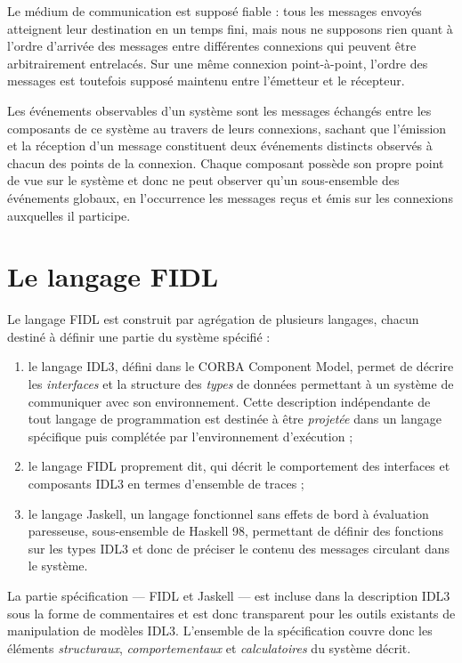 Le m\'edium de communication est suppos\'e fiable : tous les messages
envoy\'es atteignent leur destination en un temps fini, mais nous ne
supposons rien quant \`a l'ordre d'arriv\'ee des messages entre
diff\'erentes connexions qui peuvent \^etre arbitrairement entrelac\'es. Sur une m\^eme connexion
point-\`a-point, l'ordre des messages est toutefois suppos\'e maintenu entre
l'\'emetteur et le r\'ecepteur. 

Les \'ev\'enements observables d'un syst\`eme sont les messages \'echang\'es
entre les composants de ce syst\`eme au travers de leurs connexions,
sachant que l'\'emission et la r\'eception d'un message constituent deux
\'ev\'enements distincts observ\'es \`a chacun des points de la
connexion. Chaque composant poss\`ede son propre point de vue sur le
syst\`eme et donc ne peut observer qu'un sous-ensemble des \'ev\'enements
globaux, en l'occurrence les messages re\c{c}us et \'emis sur les connexions
auxquelles il participe.

\section{Le langage \textsf{FIDL}}
\label{sec:syntaxe-fidl}
Le langage \textsf{FIDL} est  construit par agr\'egation de plusieurs langages,
chacun destin\'e \`a d\'efinir une partie du syst\`eme sp\'ecifi\'e :
\begin{enumerate}
  \item le langage \textsf{IDL3}, d\'efini dans le \textsf{CORBA Component
      Model}\cite{ccmspec}, permet de d\'ecrire les
    \emph{interfaces} et la structure des \emph{types} de donn\'ees
      permettant \`a un syst\`eme de communiquer avec son environnement. Cette description ind\'ependante
    de tout langage de programmation est destin\'ee \`a \^etre
    \emph{projet\'ee} dans un langage sp\'ecifique puis compl\'et\'ee par
    l'environnement d'ex\'ecution ;
  \item le langage \textsf{FIDL} proprement dit, qui d\'ecrit le
    comportement des interfaces et composants \textsf{IDL3}  en termes d'ensemble de traces ;
  \item le langage \textsf{Jaskell}, un langage fonctionnel sans effets de bord \`a \'evaluation
    paresseuse, sous-ensemble de \textsf{Haskell
      98}\cite{h98report}, permettant de d\'efinir des
    fonctions sur les types \textsf{IDL3} et donc de pr\'eciser le contenu
    des messages circulant dans le syst\`eme. 
\end{enumerate}
La partie sp\'ecification --- \textsf{FIDL} et \textsf{Jaskell} --- est
incluse dans la description \textsf{IDL3} sous la forme de
commentaires et est donc transparent pour les
outils existants de manipulation de mod\`eles \textsf{IDL3}. L'ensemble de la sp\'ecification couvre donc  les \'el\'ements \emph{structuraux},
\emph{comportementaux} et \emph{calculatoires} du syst\`eme d\'ecrit.

